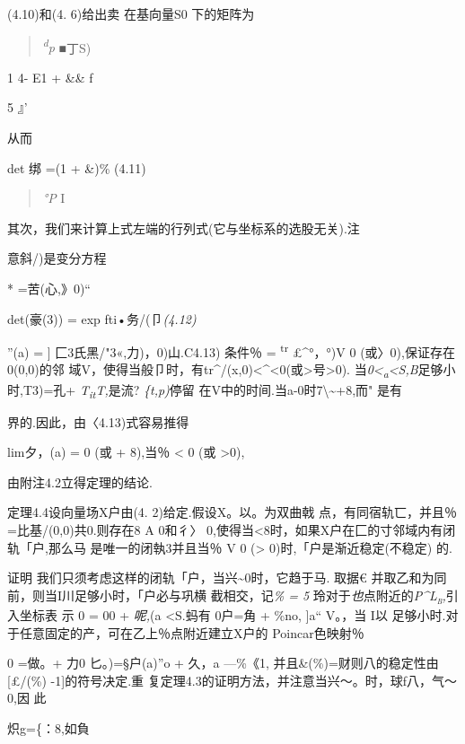 \documentclass{article}
\begin{document}
(4.10)和(4. 6)给出卖 在基向量S0 下的矩阵为

\begin{quote}
\emph{\textsuperscript{d}p} ■丁S)
\end{quote}

1 4- E1 + \&\& f

5 』'

从而

det 绑 =(1 + \&)\% (4.11)

\begin{quote}
\emph{°P} I
\end{quote}

其次，我们来计算上式左端的行列式(它与坐标系的选股无关).注

意斜/)是变分方程

* =苦(心,》0)``

det(豪(3)) = exp fti•务/(卩\emph{(4.12)}

''(a) = {]} 匚3氏黑/"3«,力)，0)山.C4.13) 条件％ = \textsuperscript{tr}
£\^{}°，°)V 0 (或〉0),保证存在0(0,0)的邻
域V，使得当般卩时，有tr\^{}/(x,0)\textless{}\^{}\textless{}0(或\textgreater{}号\textgreater{}0).
当\emph{0\textless{}\textsubscript{a}\textless{}S,B}足够小时,T3)=孔+
\emph{T\textsubscript{it}T,}是流? \emph{\{t,p)}停留
在V中的时间.当a-0时7\textbackslash{}\textasciitilde{}+8,而" 是有

界的.因此，由〈4.13)式容易推得

lim夕，(a) = 0 (或 + 8),当％ \textless{} 0 (或 \textgreater{}0),

由附注4.2立得定理的结论.\textbar{}

定理4.4设向量场X户由(4. 2)给定.假设X。以。为双曲戟
点，有同宿轨匸，并且％ =比基/(0,0)共0.则存在8 A 0和彳〉
0,使得当\textless{}8时，如果X户在匚的寸邻域内有闭轨「户,那么马
是唯一的闭執3并且当％ V 0 (\textgreater{} 0)时,「户是渐近稳定(不稳定)
的.

证明 我们只须考虑这样的闭轨「户，当兴\textasciitilde{}0时，它趋于马.
取据€ 并取乙和为同前，则当I川足够小时，「户必与巩横 截相交，记\emph{\% =
5}
玲对于\emph{也}点附近的\emph{\textsc{P\^{}L\textsubscript{b},}}引入坐标表
示 0 = 00 + \emph{呢,}(a\textbar{} \textless{}S.蚂有 0户=角 + \%no,
{]}a``\textbar{} V。，当 I以
足够小时.对于任意固定的产，可在乙上％点附近建立X户的 Poincar色映射％

0 =做。+ 力0 匕。)=§户(a)''o + 久，\textbar{}a ---\%\textbar{}《1,
并且\&(\%)=财则八的稳定性由{[}£/(\%) -1{]}的符号决定.重
复定理4.3的证明方法，并注意当兴〜。时，球f八，气〜0,因 此

炽g=\{：8,如負
\end{document}
